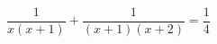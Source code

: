 \begin{ex}[type=equation]
	\begin{condition}
	\( \dfrac{1}{x(x+1)}+\dfrac{1}{(x+1)(x+2)}=\dfrac{1}{4} \)
	\end{condition}
\end{ex}